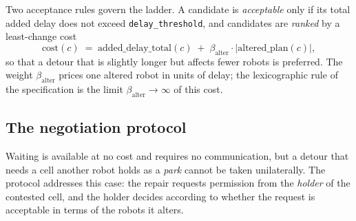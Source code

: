 \documentclass[10pt,a4paper]{article}
\newcommand{\code}[1]{\texttt{#1}}
\begin{document}
Two acceptance rules govern the ladder.  A candidate is \emph{acceptable}
only if its total added delay does not exceed \code{delay\_threshold}, and
candidates are \emph{ranked} by a least-change cost
%
\[
  \text{cost}(c) \;=\; \text{added\_delay\_total}(c) \;+\;
  \beta_{\text{alter}} \cdot \bigl|\text{altered\_plan}(c)\bigr| ,
\]
%
so that a detour that is slightly longer but affects fewer robots is
preferred.  The weight $\beta_{\text{alter}}$ prices one altered robot in
units of delay; the lexicographic rule of the specification is the limit
$\beta_{\text{alter}} \to \infty$ of this cost.
\subsection{The negotiation protocol}\label{sec:negotiate}

Waiting is available at no cost and requires no communication, but a detour
that needs a cell another robot holds as a \emph{park} cannot be taken
unilaterally.  The protocol addresses this case: the repair requests
permission from the \emph{holder} of the contested cell, and the holder
decides according to whether the request is acceptable in terms of the robots
it alters.
\end{document}
